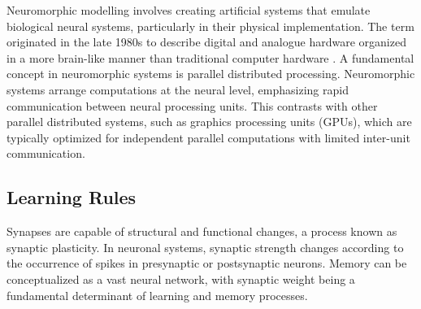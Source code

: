 
\noindent Neuromorphic modelling involves creating artificial systems that emulate biological neural systems, particularly in their physical implementation. The term originated in the late 1980s to describe digital and analogue hardware organized in a more brain-like manner than traditional computer hardware \cite{mead1990neuromorphic}. A fundamental concept in neuromorphic systems is parallel distributed processing. Neuromorphic systems arrange computations at the neural level, emphasizing rapid communication between neural processing units. This contrasts with other parallel distributed systems, such as graphics processing units (GPUs), which are typically optimized for independent parallel computations with limited inter-unit communication.

\subsection[Learning Rules]{Learning Rules}


\noindent Synapses are capable of structural and functional changes, a process known as synaptic plasticity. In neuronal systems, synaptic strength changes according to the occurrence of spikes in presynaptic or postsynaptic neurons. Memory can be conceptualized as a vast neural network, with synaptic weight being a fundamental determinant of learning and memory processes.\\


